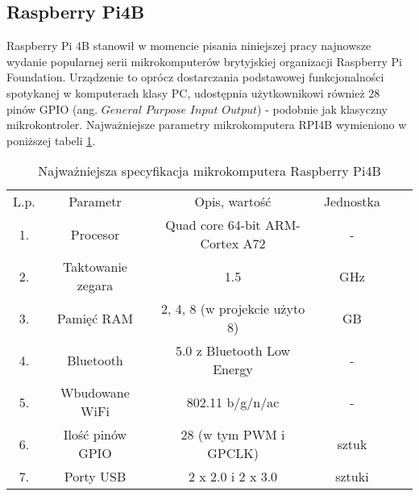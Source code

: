 \subsection{Raspberry Pi4B}

Raspberry Pi 4B stanowił w momencie pisania niniejszej pracy najnowsze wydanie popularnej serii mikrokomputerów brytyjskiej organizacji Raspberry Pi Foundation. Urządzenie to oprócz dostarczania podstawowej funkcjonalności spotykanej w komputerach klasy PC, udostępnia użytkownikowi również 28 pinów GPIO (ang. $General$ $Purpose$ $Input$ $Output$) - podobnie jak klasyczny mikrokontroler. Najważniejsze parametry mikrokomputera RPI4B wymieniono w poniższej tabeli \ref{tab:2}.


\begin{table}[H]
\centering
\caption{Najważniejsza specyfikacja mikrokomputera Raspberry Pi4B \cite{RPI_par}}
\label{tab:2}
\begin{tabular}{|c|c|c|c|ll}
\cline{1-4}
\cellcolor[HTML]{C0C0C0}L.p. & \cellcolor[HTML]{C0C0C0}Parametr          & \cellcolor[HTML]{C0C0C0}Opis, wartość                   & \cellcolor[HTML]{C0C0C0}Jednostka &  &  \\ \cline{1-4}
\cellcolor[HTML]{EFEFEF}1.   & \cellcolor[HTML]{EFEFEF}Procesor          & \cellcolor[HTML]{EFEFEF}Quad core 64-bit ARM-Cortex A72 & \cellcolor[HTML]{EFEFEF}-         &  &  \\ \cline{1-4}
\cellcolor[HTML]{C0C0C0}2.   & \cellcolor[HTML]{C0C0C0}Taktowanie zegara & \cellcolor[HTML]{C0C0C0}1.5                             & \cellcolor[HTML]{C0C0C0}GHz       &  &  \\ \cline{1-4}
\cellcolor[HTML]{EFEFEF}3.   & \cellcolor[HTML]{EFEFEF}Pamięć RAM        & \cellcolor[HTML]{EFEFEF}2, 4, 8 (w projekcie użyto 8)   & \cellcolor[HTML]{EFEFEF}GB        &  &  \\ \cline{1-4}
\cellcolor[HTML]{C0C0C0}4.   & \cellcolor[HTML]{C0C0C0}Bluetooth         & \cellcolor[HTML]{C0C0C0}5.0 z Bluetooth Low Energy      & \cellcolor[HTML]{C0C0C0}-         &  &  \\ \cline{1-4}
\cellcolor[HTML]{EFEFEF}5.   & \cellcolor[HTML]{EFEFEF}Wbudowane WiFi    & \cellcolor[HTML]{EFEFEF}802.11 b/g/n/ac                 & \cellcolor[HTML]{EFEFEF}-         &  &  \\ \cline{1-4}
\cellcolor[HTML]{C0C0C0}6.   & \cellcolor[HTML]{C0C0C0}Ilość pinów GPIO  & \cellcolor[HTML]{C0C0C0}28 (w tym PWM i GPCLK)          & \cellcolor[HTML]{C0C0C0}sztuk     &  &  \\ \cline{1-4}
\cellcolor[HTML]{EFEFEF}7.   & \cellcolor[HTML]{EFEFEF}Porty USB         & \cellcolor[HTML]{EFEFEF}2 x 2.0 i 2 x 3.0               & \cellcolor[HTML]{EFEFEF}sztuki    &  &  \\ \cline{1-4}

\end{tabular}
\end{table}

